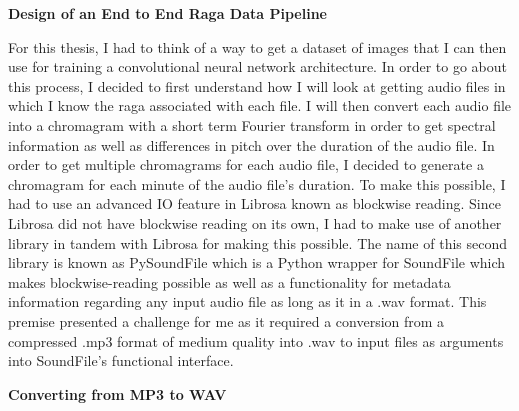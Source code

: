 \doublespacing
\setlength{\parindent}{1cm}

\begin{flushleft}
  \textbf{Design of an End to End Raga Data Pipeline}
\end{flushleft}

For this thesis, I had to think of a way to get a dataset of images that I can then use for training a convolutional neural network architecture. In order to go about this process, I decided to first understand how I will look at getting audio files in which I know the raga associated with each file. I will then convert each audio file into a chromagram with a short term Fourier transform in order to get spectral information as well as differences in pitch over the duration of the audio file. In order to get multiple chromagrams for each audio file, I decided to generate a chromagram for each minute of the audio file's duration. To make this possible, I had to use an advanced I\/O feature in Librosa known as blockwise reading. Since Librosa did not have blockwise reading on its own, I had to make use of another library in tandem with Librosa for making this possible. The name of this second library is known as PySoundFile which is a Python wrapper for SoundFile which makes blockwise-reading possible as well as a functionality for metadata information regarding any input audio file as long as it in a .wav format. This premise presented a challenge for me as it required a conversion from a compressed .mp3 format of medium quality into .wav to input files as arguments into SoundFile's functional interface.

\begin{flushleft}
  \textbf{Converting from MP3 to WAV}
\end{flushleft}

